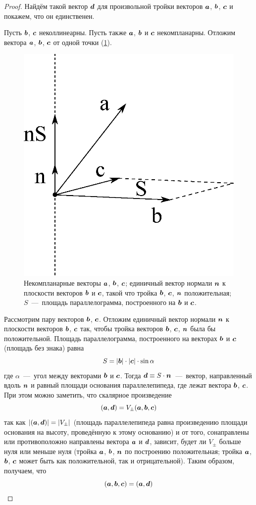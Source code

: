\documentclass[a4paper,12pt]{article}
\begin{document}
  \begin{proof}
    Найдём такой вектор $\boldsymbol d$ для произвольной тройки векторов $\boldsymbol a$, $\boldsymbol b$, $\boldsymbol c$ и покажем, что он единственен.
    
    Пусть $\boldsymbol b$, $\boldsymbol c$ неколлинеарны.
    Пусть также $\boldsymbol a$, $\boldsymbol b$ и $\boldsymbol c$ некомпланарны.
    Отложим вектора $\boldsymbol a$, $\boldsymbol b$, $\boldsymbol c$ от одной точки (\ref{fig:triple-product}).
    
    \begin{figure}[h]
      \centering
      
      \includegraphics[width=0.5\columnwidth]{triple-product}
      
      \caption{Некомпланарные векторы $\boldsymbol a$, $\boldsymbol b$, $\boldsymbol c$; единичный вектор нормали $\boldsymbol n$ к плоскости векторов $\boldsymbol b$ и $\boldsymbol c$, такой что тройка $\boldsymbol b$, $\boldsymbol c$, $\boldsymbol n$ положительная; $S$~---~площадь параллелограмма, построенного на $\boldsymbol b$ и $\boldsymbol c$.}
      \label{fig:triple-product}
    \end{figure}
  
    Рассмотрим пару векторов $\boldsymbol b$, $\boldsymbol c$.
    Отложим единичный вектор нормали $\boldsymbol n$ к плоскости векторов $\boldsymbol b$, $\boldsymbol c$ так, чтобы тройка векторов $\boldsymbol b$, $\boldsymbol c$, $\boldsymbol n$ была бы положительной.
    Площадь параллелограмма, построенного на векторах $\boldsymbol b$ и $\boldsymbol c$ (площадь без знака) равна
    \[
      S = |\boldsymbol b| \cdot |\boldsymbol c| \cdot \sin\alpha
    \]
    где $\alpha$~---~угол между векторами $\boldsymbol b$ и $\boldsymbol c$.
    Тогда $\bds d \hm\equiv S \hm\cdot \bds n$~---~вектор, направленный вдоль $\boldsymbol n$ и равный площади основания параллелепипеда, где лежат вектора $\boldsymbol b$, $\boldsymbol c$.
    При этом можно заметить, что скалярное произведение
    \[
      (\boldsymbol a, \boldsymbol d) = V_{\pm}(\boldsymbol a, \boldsymbol b, \boldsymbol c)
    \]
    так как $|(\bds a, \bds d)| \hm= |V_{\pm}|$ (площадь параллелепипеда равна произведению площади основания на высоту, проведённую к этому основанию) и от того, сонаправлены или противоположно направлены вектора $\boldsymbol a$ и $
    \boldsymbol d$, зависит, будет ли $V_{\pm}$ больше нуля или меньше нуля (тройка $\boldsymbol a$, $\boldsymbol b$, $\boldsymbol n$ по построению положительная; тройка $\boldsymbol a$, $\boldsymbol b$, $\boldsymbol c$ может быть как положительной, так и отрицательной).
    Таким образом, получаем, что
    \[
      (\boldsymbol a, \boldsymbol b, \boldsymbol c) = (\boldsymbol a, \boldsymbol d)
    \]
    

\end{proof}
\end{document}
